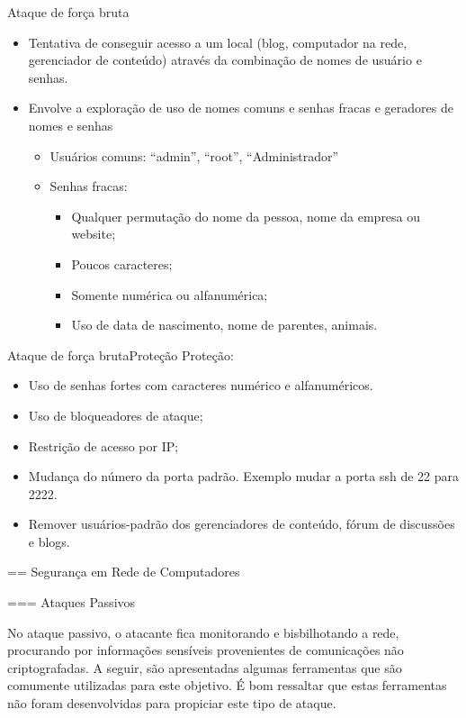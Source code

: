   
  \begin{frame}{Ataque de força bruta}
    \begin{itemize}[<+->]
    \item    Tentativa de conseguir acesso a um local (blog, computador na rede, gerenciador de conteúdo) através da combinação de nomes de usuário e senhas.
    \item Envolve a exploração de uso de nomes comuns e senhas fracas e geradores de nomes e senhas
      \begin{itemize}
      \item Usuários comuns: ``admin'', ``root'', ``Administrador''
      \item Senhas fracas:
        \begin{itemize}
        \item Qualquer permutação do nome da pessoa, nome da empresa ou website;
        \item Poucos caracteres;
        \item Somente numérica ou alfanumérica;
        \item Uso de data de nascimento,  nome de parentes, animais.
        \end{itemize}
      \end{itemize}
    \end{itemize}
  \end{frame}

  \begin{frame}{Ataque de força bruta}{Proteção}
    Proteção:\\
    \begin{itemize}[<+->]
    \item Uso de senhas fortes com caracteres numérico e alfanuméricos.
    \item Uso de bloqueadores de ataque;
    \item Restrição de acesso por IP;
    \item Mudança do número da porta padrão. Exemplo mudar a porta ssh de 22 para 2222.
    \item Remover usuários-padrão dos gerenciadores de conteúdo, fórum de discussões e blogs.
    \end{itemize}
  \end{frame}



== Segurança em Rede de Computadores

=== Ataques Passivos

No ataque passivo, o atacante fica monitorando e bisbilhotando a rede,
procurando por informações sensíveis provenientes de comunicações não
criptografadas. A seguir, são apresentadas algumas ferramentas que são
comumente utilizadas para este objetivo. É bom ressaltar que estas
ferramentas não foram desenvolvidas para propiciar este tipo de
ataque.


